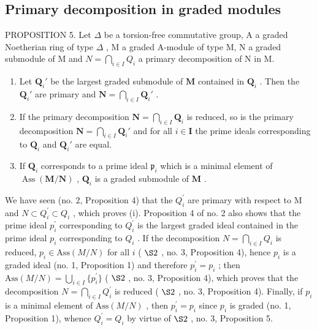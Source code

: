 \subsection{Primary decomposition in graded modules}

PROPOSITION 5. Let \(\Delta\) be a torsion-free commutative group, A a graded Noetherian ring of type \(\Delta\) , M a graded A-module of type M, N a graded submodule of M and \(N = \bigcap_{i \in I} Q_i\) a primary decomposition of N in M.

\begin{enumerate}
\def\labelenumi{(\roman{enumi})}
\item
  Let \(\mathbf{Q}_i'\) be the largest graded submodule of \(\mathbf{M}\) contained in \(\mathbf{Q}_i\) . Then the \(\mathbf{Q}_i'\) are primary and \(\mathbf{N} = \bigcap_{i \in I} \mathbf{Q}_i'\) .
\item
  If the primary decomposition \(\mathbf{N} = \bigcap_{i\in I}\mathbf{Q}_i\) is reduced, so is the primary decomposition \(\mathbf{N} = \bigcap_{i\in I}\mathbf{Q}_i'\) and for all \(i\in \mathbf{I}\) the prime ideals corresponding to \(\mathbf{Q}_i\) and \(\mathbf{Q}_i'\) are equal.
\item
  If \(\mathbf{Q}_i\) corresponds to a prime ideal \(\mathfrak{p}_i\) which is a minimal element of \(\operatorname{Ass}(\mathbf{M} / \mathbf{N})\) , \(\mathbf{Q}_i\) is a graded submodule of \(\mathbf{M}\) .
\end{enumerate}

We have seen (no. 2, Proposition 4) that the \(Q_{i}^{\prime}\) are primary with respect to M and \(N \subset Q_{i}^{\prime} \subset Q_{i}\) , which proves (i). Proposition 4 of no. 2 also shows that the prime ideal \(p_{i}^{\prime}\) corresponding to \(Q_{i}^{\prime}\) is the largest graded ideal contained in the prime ideal \(p_{i}\) corresponding to \(Q_{i}\) . If the decomposition \(N = \bigcap_{i \in I} Q_{i}\) is reduced, \(p_{i} \in \text{Ass}(M/N)\) for all \(i\) ( \(\S 2\) , no. 3, Proposition 4), hence \(p_{i}\) is a graded ideal (no. 1, Proposition 1) and therefore \(p_{i}^{\prime} = p_{i}\) ; then \(\text{Ass}(M/N) = \bigcup_{i \in I} \{p_{i}^{\prime}\}\) ( \(\S 2\) , no. 3, Proposition 4), which proves that the decomposition \(N = \bigcap_{i \in I} Q_{i}^{\prime}\) is reduced ( \(\S 2\) , no. 3, Proposition 4). Finally, if \(p_{i}\) is a minimal element of \(\text{Ass}(M/N)\) , then \(p_{i}^{\prime} = p_{i}\) since \(p_{i}\) is graded (no. 1, Proposition 1), whence \(Q_{i}^{\prime} = Q_{i}\) by virtue of \(\S 2\) , no. 3, Proposition 5.

\relax{}
